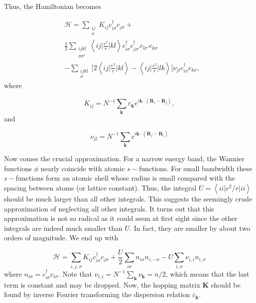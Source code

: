 \documentclass[10pt, twocolumn, twoside]{article}
\begin{document}
Thus, the Hamiltonian becomes 

\begin{equation}
\begin{split}
&\mathcal{H} = \sum_{\substack{ i j \\ \sigma} } K_{ij} c_{i \sigma}^\dagger c_{j \sigma} + \\
&\frac{1}{2} \sum_{\substack{i j k l \\ \sigma \sigma'} }\left\langle i j \bigg| \frac{e^2}{r} \bigg| k l \right\rangle 
 c_{i \sigma}^\dagger c_{j \sigma'}^\dagger c_{l \sigma'} c_{ k \sigma} \\
 &- \sum_{\substack{ijkl \\ \sigma }} \bigg[ 2 \left\langle i j \bigg| \frac{e^2}{r} \bigg| k l \right\rangle - \left\langle i j \bigg| \frac{e^2}{r} \bigg| l k \right\rangle \bigg] \nu_{j l} c_{i \sigma}^\dagger c_{ k \sigma} ,
\end{split}
\end{equation}
where

\begin{equation}\label{eq:hopping_matrix}
K_{ij} = N^{-1} \sum_{\bm k} \varepsilon_{\bm k} e^{i \bm k \cdot ( \bm R_i - \bm R_j )},
\end{equation}
and

\begin{equation}
\nu_{j l} = N^{-1} \sum_{\bm k} e^{i \bm k \cdot ( \bm R_j - \bm R_l) }
\end{equation}

Now comes the crucial approximation. For a narrow energy band, the Wannier functions $\phi$ nearly coincide with atomic $s-$functions. For small bandwidth these $s-$functions form an atomic shell whose radius is small compared with the spacing between atoms (or lattice constant). Thus, the integral $U = \left\langle i i \big| e^2 / r \big| i i \right\rangle$ should be much larger than all other integrals. This suggests the seemingly crude approximation of neglecting all other integrals. It turns out that this approximation is not so radical as it could seem at first sight since the other integrals are indeed much smaller than $U$. In fact, they are smaller by about two orders of magnitude. We end up with

\begin{equation}
\mathcal{H} = \sum_{i, j, \sigma} K_{ij} c_{i\sigma}^\dagger c_{j\sigma} + \frac{U}{2} \sum_{i\sigma} n_{i\sigma} n_{i, -\sigma} - U \sum_{i, \sigma} \nu_{i, i} n_{i, \sigma}
\end{equation}
where $n_{i\sigma} = c_{i\sigma}^\dagger c_{i\sigma}$. Note that $\nu_{i, i} = N^{-1} \sum_{\bm k} \nu_{\bm k} = n/2$, which means that the last term is constant and may be dropped. Now, the hopping matrix $\bm K$ should be found by inverse Fourier transforming the dispersion relation $\varepsilon_{\bm k}$.
\end{document}
